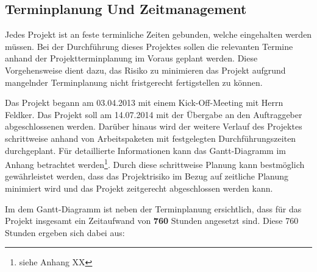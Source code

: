 \subsection{Terminplanung Und Zeitmanagement}
\label{sec:TerminplanungUndZeitManagement}

Jedes Projekt ist an feste terminliche Zeiten gebunden, welche eingehalten werden müssen. Bei der Durchführung dieses 
Projektes sollen die relevanten Termine anhand der Projektterminplanung im Voraus geplant werden. Diese Vorgehensweise 
dient dazu, das Risiko zu minimieren das Projekt aufgrund mangelnder Terminplanung nicht fristgerecht fertigstellen zu 
können. 

Das Projekt begann am 03.04.2013 mit einem Kick-Off-Meeting mit Herrn Feldker. Das Projekt 
soll am 14.07.2014 mit der Übergabe an den Auftraggeber abgeschlossenen werden. Darüber hinaus wird 
der weitere Verlauf des Projektes schrittweise anhand von 
Arbeitspaketen mit festgelegten Durchführungszeiten durchgeplant. Für detaillierte Informationen kann das Gantt-Diagramm 
im Anhang betrachtet werden\footnote{siehe Anhang XX}.
Durch diese schrittweise Planung kann bestmöglich gewährleistet werden, dass das  Projektrisiko im Bezug auf zeitliche 
Planung minimiert wird und das Projekt zeitgerecht abgeschlossen werden kann.

Im dem Gantt-Diagramm ist neben der Terminplanung ersichtlich, dass für das Projekt insgesamt ein Zeitaufwand von
\textbf{760} Stunden angesetzt sind. Diese 760 Stunden ergeben sich dabei aus:

